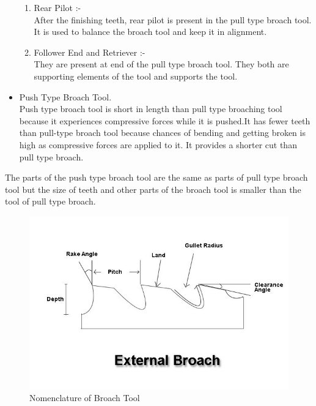\documentclass[16pt,a4paper]{article}
\begin{document}
\begin{itemize}
\begin{enumerate}
\item Rear Pilot :- \\   
After the finishing teeth, rear pilot is present in the pull type broach tool. It is used to balance the broach tool and keep it in alignment.
\item Follower End and Retriever :- \\     
They are present at end of the pull type broach tool. They both are supporting elements of the tool and supports the tool.

\end{enumerate}

\item Push Type Broach Tool. \\   
Push type broach tool is short in length than pull type broaching tool because it experiences compressive forces while it is pushed.It has fewer teeth than pull-type broach tool because chances of bending and getting broken is high as compressive forces are applied to it.
It provides a shorter cut than pull type broach.

\end{itemize}

The parts of the push type broach tool are the same as parts of pull type broach tool but the size of teeth and other parts of the broach tool is smaller than the tool of pull type broach. 

\begin{figure}[h]
\centering
\includegraphics[scale=0.5]{Nomenclature of Broach Tool}
\caption{Nomenclature of Broach Tool}
\label{fig:Nomenclature of Broach Tool}
\end{figure}
\end{document}

